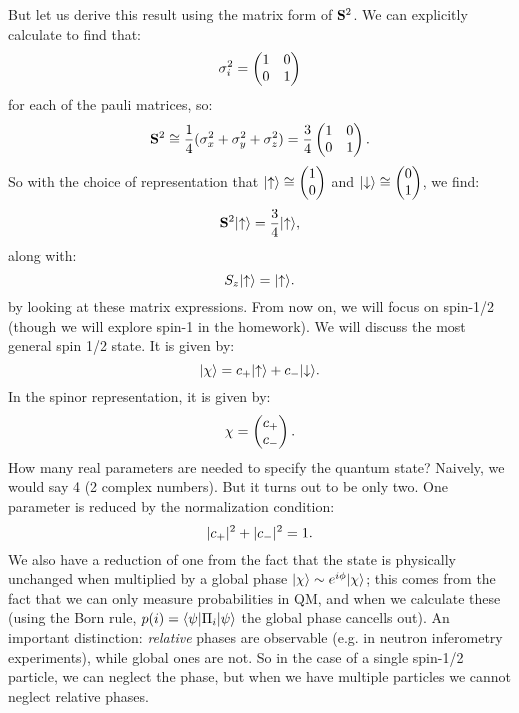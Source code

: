 But let us derive this result using the matrix form of $\mathbf{S}^2$. We can explicitly calculate to find that:
\begin{equation}
    \sigma_i^2 = \begin{pmatrix} 1 & 0 \\ 0 & 1 \end{pmatrix}
\end{equation}
for each of the pauli matrices, so:
\begin{equation}
    \mathbf{S}^2 \cong \frac{1}{4}(\sigma_x^2 + \sigma_y^2 + \sigma_z^2) = \frac{3}{4}\begin{pmatrix} 1 & 0 \\ 0 & 1 \end{pmatrix}.
\end{equation}
So with the choice of representation that $\lvert \uparrow \rangle \cong \begin{pmatrix}1 \\ 0\end{pmatrix}$ and $\lvert \downarrow \rangle \cong \begin{pmatrix}0\\ 1\end{pmatrix}$, we find:
\begin{equation}
    \mathbf{S}^2\lvert \uparrow \rangle = \frac{3}{4}\lvert \uparrow \rangle,
\end{equation}
along with:
\begin{equation}
    S_z\lvert \uparrow \rangle = \lvert \uparrow \rangle.
\end{equation}
by looking at these matrix expressions. From now on, we will focus on spin-1/2 (though we will explore spin-1 in the homework). We will discuss the most general spin 1/2 state. It is given by:
\begin{equation}
    \lvert \chi \rangle = c_+\lvert \uparrow \rangle + c_-\lvert \downarrow \rangle.
\end{equation}
In the spinor representation, it is given by:
\begin{equation}
    \chi = \begin{pmatrix}c_+ \\ c_-\end{pmatrix}.
\end{equation}
How many real parameters are needed to specify the quantum state? Naively, we would say 4 (2 complex numbers). But it turns out to be only two. One parameter is reduced by the normalization condition:
\begin{equation}
    \lvert c_+ \rvert^2 + \lvert c_- \rvert^2 = 1.
\end{equation}
We also have a reduction of one from the fact that the state is physically unchanged when multiplied by a global phase $\ket{\chi} \sim e^{i\phi}\ket{\chi}$; this comes from the fact that we can only measure probabilities in QM, and when we calculate these (using the Born rule, $p(i) = \langle \psi \rvert\Pi_i\lvert \psi \rangle$ the global phase cancells out). An important distinction: \emph{relative} phases are observable (e.g. in neutron inferometry experiments), while global ones are not. So in the case of a single spin-1/2 particle, we can neglect the phase, but when we have multiple particles we cannot neglect relative phases.

